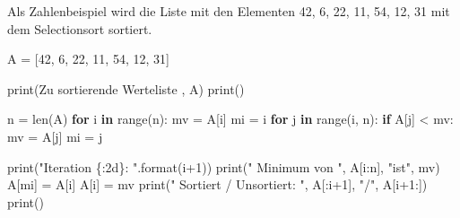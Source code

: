 \documentclass[
  letterpaper,
  DIV=11,
  numbers=noendperiod]{scrreprt}
\newenvironment{Shaded}{\begin{snugshade}}{\end{snugshade}}
\newcommand{\BuiltInTok}[1]{\textcolor[rgb]{0.00,0.23,0.31}{#1}}
\newcommand{\ControlFlowTok}[1]{\textcolor[rgb]{0.00,0.23,0.31}{\textbf{#1}}}
\newcommand{\DecValTok}[1]{\textcolor[rgb]{0.68,0.00,0.00}{#1}}
\newcommand{\KeywordTok}[1]{\textcolor[rgb]{0.00,0.23,0.31}{\textbf{#1}}}
\newcommand{\NormalTok}[1]{\textcolor[rgb]{0.00,0.23,0.31}{#1}}
\newcommand{\OperatorTok}[1]{\textcolor[rgb]{0.37,0.37,0.37}{#1}}
\newcommand{\SpecialCharTok}[1]{\textcolor[rgb]{0.37,0.37,0.37}{#1}}
\newcommand{\StringTok}[1]{\textcolor[rgb]{0.13,0.47,0.30}{#1}}
\begin{document}
Als Zahlenbeispiel wird die Liste mit den Elementen 42, 6, 22, 11, 54,
12, 31 mit dem Selectionsort sortiert.

\begin{Shaded}
\begin{Highlighting}[]
\NormalTok{A }\OperatorTok{=}\NormalTok{ [}\DecValTok{42}\NormalTok{, }\DecValTok{6}\NormalTok{, }\DecValTok{22}\NormalTok{, }\DecValTok{11}\NormalTok{, }\DecValTok{54}\NormalTok{, }\DecValTok{12}\NormalTok{, }\DecValTok{31}\NormalTok{]}

\BuiltInTok{print}\NormalTok{(}\StringTok{\textquotesingle{}Zu sortierende Werteliste \textquotesingle{}}\NormalTok{, A)}
\BuiltInTok{print}\NormalTok{()}

\NormalTok{n }\OperatorTok{=} \BuiltInTok{len}\NormalTok{(A)}
\ControlFlowTok{for}\NormalTok{ i }\KeywordTok{in} \BuiltInTok{range}\NormalTok{(n):}
\NormalTok{    mv }\OperatorTok{=}\NormalTok{ A[i]}
\NormalTok{    mi }\OperatorTok{=}\NormalTok{ i}
    \ControlFlowTok{for}\NormalTok{ j }\KeywordTok{in} \BuiltInTok{range}\NormalTok{(i, n):}
        \ControlFlowTok{if}\NormalTok{ A[j] }\OperatorTok{\textless{}}\NormalTok{ mv:}
\NormalTok{            mv }\OperatorTok{=}\NormalTok{ A[j]}
\NormalTok{            mi }\OperatorTok{=}\NormalTok{ j}

    \BuiltInTok{print}\NormalTok{(}\StringTok{"Iteration }\SpecialCharTok{\{:2d\}}\StringTok{: "}\NormalTok{.}\BuiltInTok{format}\NormalTok{(i}\OperatorTok{+}\DecValTok{1}\NormalTok{))}
    \BuiltInTok{print}\NormalTok{(}\StringTok{"   Minimum von "}\NormalTok{, A[i:n], }\StringTok{"ist"}\NormalTok{, mv)}
\NormalTok{    A[mi] }\OperatorTok{=}\NormalTok{ A[i]}
\NormalTok{    A[i] }\OperatorTok{=}\NormalTok{ mv}
    \BuiltInTok{print}\NormalTok{(}\StringTok{"   Sortiert / Unsortiert: "}\NormalTok{, A[:i}\OperatorTok{+}\DecValTok{1}\NormalTok{], }\StringTok{"/"}\NormalTok{, A[i}\OperatorTok{+}\DecValTok{1}\NormalTok{:])}
    \BuiltInTok{print}\NormalTok{()}
\end{Highlighting}
\end{Shaded}
\end{document}
